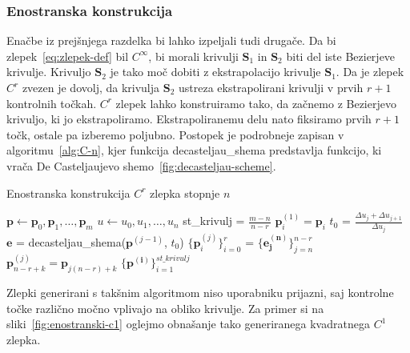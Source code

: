 \documentclass[isrm2, tisk]{fmfdelo}
\newcommand{\p}{\mathbf{p}}
\begin{document}
    \subsubsection{Enostranska konstrukcija}
    Enačbe iz prejšnjega razdelka bi lahko izpeljali tudi drugače.
    Da bi zlepek~\eqref{eq:zlepek-def} bil $C^{\infty}$, bi morali krivulji $\mathbf{S}_1$ in $\mathbf{S}_2$ biti del iste Bezierjeve krivulje.
    Krivuljo $\mathbf{S}_2$ je tako moč dobiti z ekstrapolacijo krivulje $\mathbf{S}_1$.
    Da je zlepek $C^r$ zvezen je dovolj, da krivulja $\mathbf{S}_2$ ustreza ekstrapolirani krivulji v prvih $r+1$ kontrolnih točkah.
    $C^r$ zlepek lahko konstruiramo tako, da začnemo z Bezierjevo krivuljo, ki jo ekstrapoliramo.
    Ekstrapoliranemu delu nato fiksiramo prvih $r+1$ točk, ostale pa izberemo poljubno.
    Postopek je podrobneje zapisan v algoritmu~\ref{alg:C-n}, kjer funkcija decasteljau\_shema predstavlja funkcijo, ki vrača De Casteljaujevo shemo~\ref{fig:decasteljau-scheme}.
    \begin{algorithm}[H]
        \caption{Enostranska konstrukcija $C^r$ zlepka stopnje $n$}
        \label{alg:C-n}
        \begin{algorithmic}
            \State $\p \gets \p_0,\p_1,\dots,\p_{m}$
            \State $u \gets u_0,u_1,\dots,u_n$
            \State st\_krivulj = $\frac{m-n}{n-r}$
                \State $\p_i^{(1)}=\p_i$
            \EndFor
                \State $t_0$ = $\frac{\Delta u_j + \Delta u_{j+1}}{\Delta u_j}$
                \State $\mathbf{e}$ = decasteljau\_shema($\p^{(j-1)}$, $t_0$)
                \State $\{\p_i^{(j)}\}_{i=0}^{r}$ = $\{\mathbf{e^{(n)}_{j}}\}_{j=n}^{n-r}$
                    \State $\p_{n-r+k}^{(j)}=\p_{j(n-r)+k}$
                \EndFor
            \EndFor
            \State \Return $\{\mathbf{p^{(i)}}\}^{st\_krivulj}_{i=1}$
        \end{algorithmic}
    \end{algorithm}
    \noindent Zlepki generirani s takšnim algoritmom niso uporabniku prijazni, saj kontrolne točke različno močno vplivajo na obliko krivulje.
    Za primer si na sliki~\ref{fig:enostranski-c1} oglejmo obnašanje tako generiranega kvadratnega $C^1$ zlepka.
\end{document}
